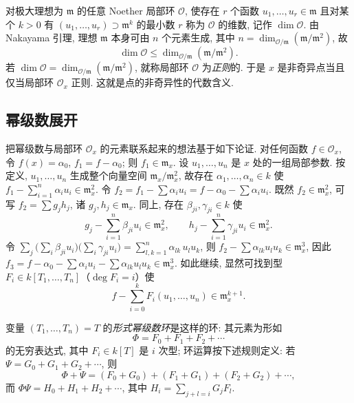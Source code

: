 对极大理想为 $\mathfrak m$ 的任意 Noether 局部环 $\mathcal O$, 使存在 $r$ 个函数 $u_1, \ldots, u_r \in \mathfrak m$ 且对某个 $k > 0$ 有 $(u_1, \ldots, u_r) \supset \mathfrak m^k$ 的最小数 $r$ 称为 $\mathcal O$ 的维数, 记作 $\dim \mathcal O$. 由 Nakayama 引理, 理想 $\mathfrak m$ 本身可由 $n$ 个元素生成, 其中 $n = \dim_{\mathcal O/\mathfrak m}(\mathfrak m/\mathfrak m^2)$, 故
\[
	\dim \mathcal O \le \dim_{\mathcal O/\mathfrak m} (\mathfrak m/\mathfrak m^2).
\]
若 $\dim \mathcal O = \dim_{\mathcal O/\mathfrak m}(\mathfrak m/\mathfrak m^2)$, 就称局部环 $\mathcal O$ 为\emph{正则}的. 于是 $x$ 是非奇异点当且仅当局部环 $\mathcal O_x$ 正则. 这就是点的非奇异性的代数含义.

\subsection{幂级数展开}

把幂级数与局部环 $\mathcal O_x$ 的元素联系起来的想法基于如下论证. 对任何函数 $f \in \mathcal O_x$, 令 $f(x) = \alpha_0$, $f_1 = f - \alpha_0$; 则 $f_1 \in \mathfrak m_x$. 设 $u_1, \ldots, u_n$ 是 $x$ 处的一组局部参数. 按定义, $u_1, \ldots, u_n$ 生成整个向量空间 $\mathfrak m_x/\mathfrak m_x^2$, 故存在 $\alpha_1, \ldots, \alpha_n \in k$ 使 $f_1 - \sum_{i=1}^n \alpha_i u_i \in \mathfrak m_x^2$. 令 $f_2 = f_1 - \sum \alpha_i u_i = f - \alpha_0 - \sum \alpha_i u_i$. 既然 $f_2 \in \mathfrak m_x^2$, 可写 $f_2 = \sum g_j h_j$, 诸 $g_j, h_j \in \mathfrak m_x$. 同上, 存在 $\beta_{ji}, \gamma_{ji} \in k$ 使
\[
	g_j - \sum_{i=1}^{n} \beta_{ji} u_i \in \mathfrak m_x^2, \qquad h_j - \sum_{i=1}^{n} \gamma_{ji} u_i \in \mathfrak m_x^2.
\]
令 $\sum_j \bigl( \sum_i \beta_{ji} u_i \bigr)\bigl( \sum_i \gamma_{ji} u_i \bigr) = \sum_{l,k=1}^{n} \alpha_{lk}\, u_l u_k$, 则 $f_2 - \sum \alpha_{lk} u_l u_k \in \mathfrak m_x^3$, 因此 $f_3 = f - \alpha_0 - \sum \alpha_i u_i - \sum \alpha_{lk} u_l u_k \in \mathfrak m_x^3$. 如此继续, 显然可找到型 $F_i \in k[T_1, \ldots, T_n]$（$\deg F_i = i$）使
\[
	f - \sum_{i=0}^{k} F_i(u_1, \ldots, u_n) \in \mathfrak m_x^{k+1}.
\]

\begin{definition}[形式幂级数环]\label{def:power-series-ring}
	变量 $(T_1, \ldots, T_n) = T$ 的\emph{形式幂级数环}是这样的环: 其元素为形如
	\begin{equation}
		\label{eq:2.18}
		\Phi = F_0 + F_1 + F_2 + \cdots
	\end{equation}
	的无穷表达式, 其中 $F_i \in k[T]$ 是 $i$ 次型; 环运算按下述规则定义: 若 $\Psi = G_0 + G_1 + G_2 + \cdots$, 则
	\[
		\Phi + \Psi = (F_0 + G_0) + (F_1 + G_1) + (F_2 + G_2) + \cdots,
	\]
	而 $\Phi\Psi = H_0 + H_1 + H_2 + \cdots$, 其中 $H_i = \sum_{j+l=i} G_j F_l$.
\end{definition}

